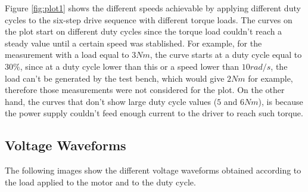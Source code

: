Figure \ref{fig:plot1} shows the different speeds achievable by applying different duty cycles to the six-step drive sequence with different torque loads. The curves on the plot start on different duty cycles since the torque load couldn’t reach a steady value until a certain speed was stablished. For example, for the measurement with a load equal to $3 Nm$, the curve starts at a duty cycle equal to $30\%$, since at a duty cycle lower than this or a speed lower than $10 rad/s$, the load can’t be generated by the test bench, which would give $2 Nm$ for example, therefore those measurements were not considered for the plot. On the other hand, the curves that don’t show large duty cycle values ($5$ and $6 Nm$), is because the power supply couldn’t feed enough current to the driver to reach such torque.

\subsection{Voltage Waveforms}

The following images show the different voltage waveforms obtained according to the load applied to the motor and to the duty cycle.

